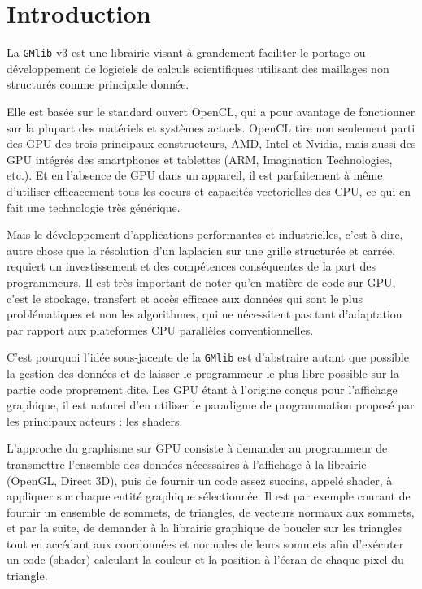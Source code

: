\documentclass[a4paper,12pt]{article}
\begin{document}
\clearpage


%
%

\section{Introduction}
La {\tt GMlib} v3 est une librairie visant à grandement faciliter le portage ou développement de logiciels de calculs scientifiques utilisant des maillages non structurés comme principale donnée.

Elle est basée sur le standard ouvert OpenCL, qui a pour avantage de fonctionner sur la plupart des matériels et systèmes actuels.
OpenCL tire non seulement parti des GPU des trois principaux constructeurs, AMD, Intel et Nvidia, mais aussi des GPU intégrés des smartphones et tablettes (ARM, Imagination Technologies, etc.).
Et en l'absence de GPU dans un appareil, il est parfaitement à même d'utiliser efficacement tous les coeurs et capacités vectorielles des CPU, ce qui en fait une technologie très générique.

Mais le développement d'applications performantes et industrielles, c'est à dire, autre chose que la résolution d'un laplacien sur une grille structurée et carrée, requiert un investissement et des compétences conséquentes de la part des programmeurs.
Il est très important de noter qu'en matière de code sur GPU, c'est le stockage, transfert et accès efficace aux données qui sont le plus problématiques et non les algorithmes, qui ne nécessitent pas tant d'adaptation par rapport aux plateformes CPU parallèles conventionnelles.

C'est pourquoi l'idée sous-jacente de la {\tt GMlib} est d'abstraire autant que possible la gestion des données et de laisser le programmeur le plus libre possible sur la partie code proprement dite.
Les GPU étant à l'origine conçus pour l'affichage graphique, il est naturel d'en utiliser le paradigme de programmation proposé par les principaux acteurs : les shaders.

L'approche du graphisme sur GPU consiste à demander au programmeur de transmettre l'ensemble des données nécessaires à l'affichage à la librairie (OpenGL, Direct 3D), puis de fournir un code assez succins, appelé shader, à appliquer sur chaque entité graphique sélectionnée.
Il est par exemple courant de fournir un ensemble de sommets, de triangles, de vecteurs normaux aux sommets, et par la suite, de demander à la librairie graphique de boucler sur les triangles tout en accédant aux coordonnées et normales de leurs sommets afin d'exécuter un code (shader) calculant la couleur et la position à l'écran de chaque pixel du triangle.
\end{document}

